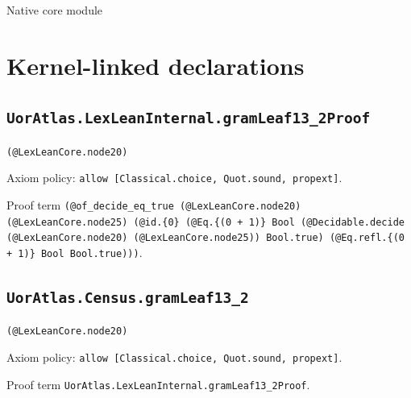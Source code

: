 \documentclass[11pt]{article}
\begin{document}
\begin{center}{\LARGE Native core module}\end{center}
\section*{Kernel-linked declarations}
\subsection*{\texttt{UorAtlas.LexLeanInternal.gramLeaf13\_2Proof}}
\noindent\texttt{(@LexLeanCore.node20)}\par
\noindent Axiom policy: \texttt{allow [Classical.choice, Quot.sound, propext]}.\par
\noindent Proof term \texttt{(@of\_decide\_eq\_true (@LexLeanCore.node20) (@LexLeanCore.node25) (@id.\{0\} (@Eq.\{(0 + 1)\} Bool (@Decidable.decide (@LexLeanCore.node20) (@LexLeanCore.node25)) Bool.true) (@Eq.refl.\{(0 + 1)\} Bool Bool.true)))}.\par
\subsection*{\texttt{UorAtlas.Census.gramLeaf13\_2}}
\noindent\texttt{(@LexLeanCore.node20)}\par
\noindent Axiom policy: \texttt{allow [Classical.choice, Quot.sound, propext]}.\par
\noindent Proof term \texttt{UorAtlas.LexLeanInternal.gramLeaf13\_2Proof}.\par
\end{document}
